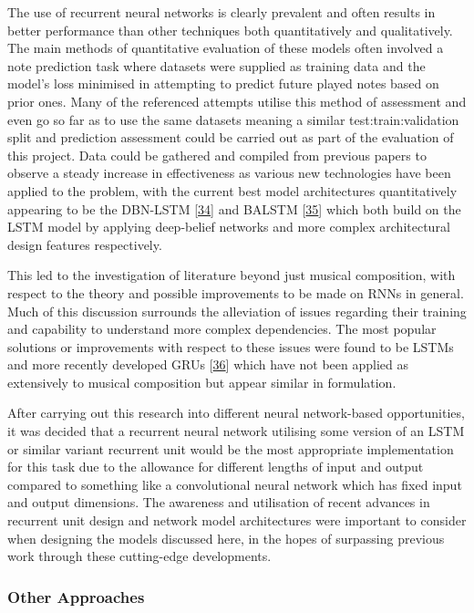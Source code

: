 \documentclass[12pt,]{article}
\begin{document}
The use of recurrent neural networks is clearly prevalent and often
results in better performance than other techniques both quantitatively
and qualitatively. The main methods of quantitative evaluation of these
models often involved a note prediction task where datasets were
supplied as training data and the model's loss minimised in attempting
to predict future played notes based on prior ones. Many of the
referenced attempts utilise this method of assessment and even go so far
as to use the same datasets meaning a similar test:train:validation
split and prediction assessment could be carried out as part of the
evaluation of this project. Data could be gathered and compiled from
previous papers to observe a steady increase in effectiveness as various
new technologies have been applied to the problem, with the current best
model architectures quantitatively appearing to be the DBN-LSTM
{[}\protect\hyperlink{ref-vohra2015modeling}{34}{]} and BALSTM
{[}\protect\hyperlink{ref-johnson2017generating}{35}{]} which both build
on the LSTM model by applying deep-belief networks and more complex
architectural design features respectively.

This led to the investigation of literature beyond just musical
composition, with respect to the theory and possible improvements to be
made on RNNs in general. Much of this discussion surrounds the
alleviation of issues regarding their training and capability to
understand more complex dependencies. The most popular solutions or
improvements with respect to these issues were found to be LSTMs and
more recently developed GRUs
{[}\protect\hyperlink{ref-cho2014learning}{36}{]} which have not been
applied as extensively to musical composition but appear similar in
formulation.

After carrying out this research into different neural network-based
opportunities, it was decided that a recurrent neural network utilising
some version of an LSTM or similar variant recurrent unit would be the
most appropriate implementation for this task due to the allowance for
different lengths of input and output compared to something like a
convolutional neural network which has fixed input and output
dimensions. The awareness and utilisation of recent advances in
recurrent unit design and network model architectures were important to
consider when designing the models discussed here, in the hopes of
surpassing previous work through these cutting-edge developments.

\hypertarget{other-approaches}{%
\subsubsection{Other Approaches}\label{other-approaches}}
\end{document}
